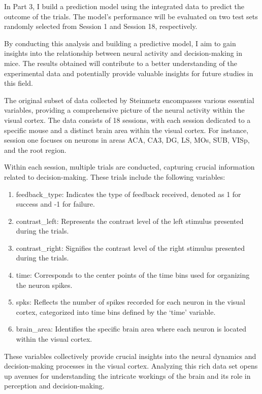 \documentclass[
]{article}
\begin{document}
In Part 3, I build a prediction model using the integrated data to
predict the outcome of the trials. The model's performance will be
evaluated on two test sets randomly selected from Session 1 and Session
18, respectively.

By conducting this analysis and building a predictive model, I aim to
gain insights into the relationship between neural activity and
decision-making in mice. The results obtained will contribute to a
better understanding of the experimental data and potentially provide
valuable insights for future studies in this field.

The original subset of data collected by Steinmetz encompasses various
essential variables, providing a comprehensive picture of the neural
activity within the visual cortex. The data consists of 18 sessions,
with each session dedicated to a specific mouse and a distinct brain
area within the visual cortex. For instance, session one focuses on
neurons in areas ACA, CA3, DG, LS, MOs, SUB, VISp, and the root region.

Within each session, multiple trials are conducted, capturing crucial
information related to decision-making. These trials include the
following variables:

\begin{enumerate}
\def\labelenumi{\arabic{enumi}.}
\item
  feedback\_type: Indicates the type of feedback received, denoted as 1
  for success and -1 for failure.
\item
  contrast\_left: Represents the contrast level of the left stimulus
  presented during the trials.
\item
  contrast\_right: Signifies the contrast level of the right stimulus
  presented during the trials.
\item
  time: Corresponds to the center points of the time bins used for
  organizing the neuron spikes.
\item
  spks: Reflects the number of spikes recorded for each neuron in the
  visual cortex, categorized into time bins defined by the `time'
  variable.
\item
  brain\_area: Identifies the specific brain area where each neuron is
  located within the visual cortex.
\end{enumerate}

These variables collectively provide crucial insights into the neural
dynamics and decision-making processes in the visual cortex. Analyzing
this rich data set opens up avenues for understanding the intricate
workings of the brain and its role in perception and decision-making.
\end{document}
